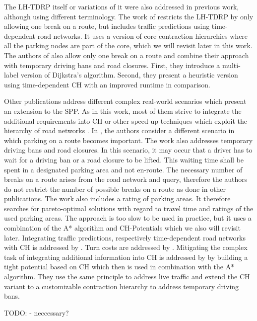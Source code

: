 The LH-TDRP itself or variations of it were also addressed in previous work, although using different terminology. The work of \cite{kleff:2017} restricts the LH-TDRP by only allowing one break on a route, but includes traffic predictions using time-dependent road networks. It uses a version of core contraction hierarchies where all the parking nodes are part of the core, which we will revisit later in this work. The authors of \cite{tuin:2018} also allow only one break on a route and combine their approach with temporary driving bans and road closures. First, they introduce a multi-label version of Dijkstra's algorithm. Second, they present a heuristic version using time-dependent CH with an improved runtime in comparison.

Other publications address different complex real-world scenarios which present an extension to the SPP. As in this work, most of them strive to integrate the additional requirements into CH or other speed-up techniques which exploit the hierarchy of road networks \cite{bast:2015}. In \cite{kleff:2020}, the authors consider a different scenario in which parking on a route becomes important. The work also addresses temporary driving bans and road closures. In this scenario, it may occur that a driver has to wait for a driving ban or a road closure to be lifted. This waiting time shall be spent in a designated parking area and not en-route. The necessary number of breaks on a route arises from the road network and query, therefore the authors do not restrict the number of possible breaks on a route as done in other publications. The work also includes a rating of parking areas. It therefore searches for pareto-optimal solutions with regard to travel time and ratings of the used parking areas. The approach is too slow to be used in practice, but it uses a combination of the A* algorithm and CH-Potentials which we also will revisit later. Integrating traffic predictions, respectively time-dependent road networks with CH is addressed by \cite{batz:2009,batz:2013}. Turn costs are addressed by \cite{geisberger:2011}. Mitigating the complex task of integrating additional information into CH is addressed by \cite{strasser:2021} by building a tight potential based on CH which then is used in combination with the A* algorithm. They use the same principle to address live traffic and extend the CH variant to a customizable contraction hierarchy \cite{dibbelt:2015} to address temporary driving bans.

TODO: \cite{mayerle:2020} - neccessary?